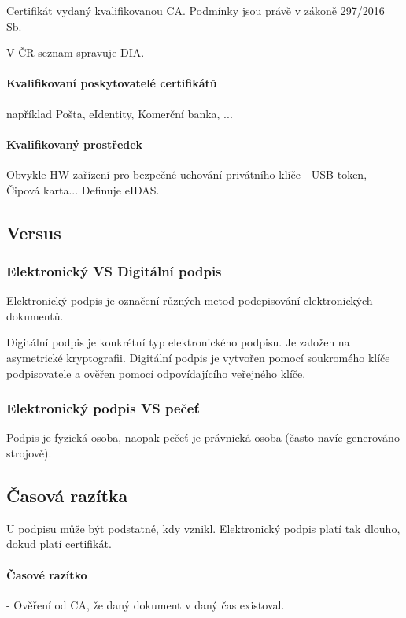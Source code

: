 \documentclass[10pt,a4paper]{article}
\begin{document}
Certifikát vydaný kvalifikovanou CA. Podmínky jsou právě v zákoně 297/2016 Sb.

V ČR seznam spravuje DIA.

\paragraph{Kvalifikovaní poskytovatelé certifikátů} například Pošta, eIdentity, Komerční banka, ...


\paragraph{Kvalifikovaný prostředek}

Obvykle HW zařízení pro bezpečné uchování privátního klíče - USB token, Čipová karta... Definuje eIDAS.


\subsection{Versus}

\subsubsection{Elektronický VS Digitální podpis}
 
Elektronický podpis je označení různých metod podepisování elektronických dokumentů. 

Digitální podpis je konkrétní typ elektronického podpisu. 
Je založen na asymetrické kryptografii. 
Digitální podpis je vytvořen pomocí soukromého klíče podpisovatele a ověřen pomocí odpovídajícího veřejného klíče. 

\subsubsection{Elektronický podpis VS pečeť}

Podpis je fyzická osoba, naopak pečeť je právnická osoba (často navíc generováno strojově).

\subsection{Časová razítka}

U podpisu může být podstatné, kdy vznikl. 
Elektronický podpis platí tak dlouho, dokud platí certifikát.

\paragraph{Časové razítko} - Ověření od CA, že daný dokument v daný čas existoval.
\end{document}
